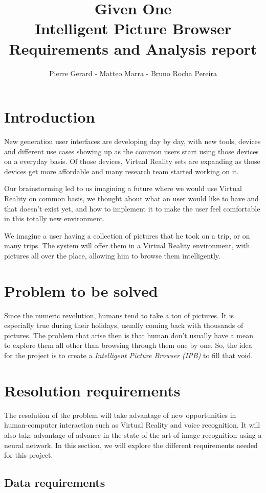 \documentclass[11pt,a4paper]{article}
\author{Pierre Gerard - Matteo Marra - Bruno Rocha Pereira}
\title{Given One \\ Intelligent Picture Browser \\ Requirements and Analysis report}
\begin{document}
\maketitle
\section{Introduction}
New generation user interfaces are developing day by day, with new tools, devices and different use cases showing up as the common users start using those devices on a everyday basis.
Of those devices, Virtual Reality sets are expanding as those devices get more affordable and many research team started working on it. 

Our brainstorming led to us imagining a future where we would use Virtual Reality on common basis, we thought about what an user would like to have and that doesn't exist yet, and how to implement it to make the user feel comfortable in this totally new environment. 

We imagine a user having a collection of pictures that he took on a trip, or on many trips. The system will offer them in a Virtual Reality environment, with pictures all over the place, allowing him to browse them intelligently.

\section{Problem to be solved}

Since the numeric revolution, humans tend to take a ton of pictures. It is especially true during their holidays, usually coming back with thousands of pictures. The problem that arise then is that human don't usually have a mean to explore them all other than browsing through them one by one. So, the idea for the project is to create a \textit{Intelligent Picture Browser (IPB)} to fill that void.
 
\section{Resolution requirements}

The resolution of the problem will take advantage of new opportunities in human-computer interaction such as Virtual Reality and voice recognition. It will also take advantage of advance in the state of the art of image recognition using a neural network. In this section, we will explore the different requirements needed for this project.

\subsection{Data requirements}
\end{document}
